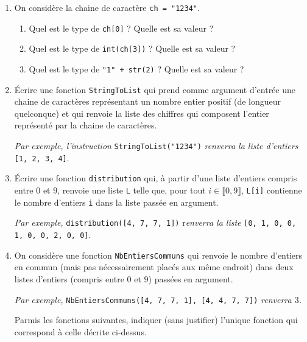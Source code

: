\documentclass[a4paper, 11pt,reqno]{article}
\begin{document}
\begin{exercice}

\begin{enumerate}

\item On consid\`ere la chaine de caract\`ere \verb|ch = "1234"|.

\begin{enumerate}

\item Quel est le type de \verb|ch[0]| ? Quelle est sa valeur ?
\item Quel est le type de \verb|int(ch[3])| ? Quelle est sa valeur ?
\item Quel est le type de \verb|"1" + str(2)| ? Quelle est sa valeur ?

\end{enumerate}

\item \'Ecrire une fonction \verb|StringToList| qui prend comme argument d'entrée une chaine de caractères repr\'esentant un nombre entier positif (de longueur quelconque) et qui renvoie la liste des chiffres qui composent l'entier repr\'esent\'e par la chaine de caract\`eres.

\textit{Par exemple, l'instruction }\verb|StringToList("1234")| \textit{renverra la liste d'entiers }\verb|[1, 2, 3, 4]|.
\item \'Ecrire une fonction \verb|distribution| qui, \`a partir d'une liste d'entiers compris entre $0$ et $9$, renvoie une liste \verb|L| telle que, pour tout $i\in\llbracket0,9\rrbracket$, \verb|L[i]| contienne le nombre d'entiers \verb|i| dans la liste pass\'ee en argument.

\textit{Par exemple, }\verb|distribution([4, 7, 7, 1])| r\textit{enverra la liste} \verb|[0, 1, 0, 0, 1, 0, 0, 2, 0, 0]|.
\item On consid\`ere une fonction \verb|NbEntiersCommuns| qui renvoie le nombre d'entiers en commun (mais pas n\'ecessairement plac\'es aux m\^eme endroit) dans deux listes d'entiers (compris entre $0$ et $9$) pass\'ees en argument.

\textit{Par exemple,} \verb|NbEntiersCommuns([4, 7, 7, 1], [4, 4, 7, 7])| \textit{renverra $3$.}

Parmis les fonctions suivantes, indiquer (sans justifier) l'unique fonction qui correspond \`a celle d\'ecrite ci-dessus.


\end{enumerate}
\end{exercice}
\end{document}
